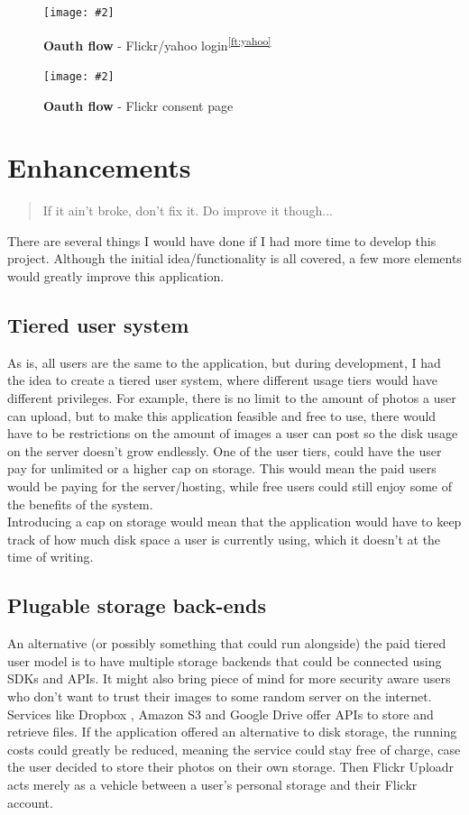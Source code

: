 \documentclass[10pt, a4paper]{article}
\newcommand{\figuremacro}[5]{
\begin{figure}[#1]
\centering
\texttt{[image: \#2]}
\caption[#3]{\textbf{#3}#4}
\label{fig:#2}
\end{figure}
}
\newcommand{\footref}[1]{\textsuperscript{\ref{#1}}}
\begin{document}
        \figuremacro{h}{flickr-login}{Oauth flow}{ - Flickr/yahoo login\footref{ft:yahoo}}{1.0}

        \figuremacro{h}{flickr-consent}{Oauth flow}{ - Flickr consent page}{1.0}

        \section{Enhancements}
        \label{sec:enhancements}
        \blockquote{If it ain't broke, don't fix it. Do improve it though...}

        There are several things I would have done if I had more time to develop this project. Although the initial idea/functionality is all covered, a few more elements would greatly improve this application. 

        \subsection{Tiered user system}	
        As is, all users are the same to the application, but during development, I had the idea to create a tiered user system, where different usage tiers would have different privileges. For example, there is no limit to the amount of photos a user can upload, but to make this application feasible and free to use, there would have to be restrictions on the amount of images a user can post so the disk usage on the server doesn't grow endlessly. One of the user tiers, could have the user pay for unlimited or a higher cap on storage. This would mean the paid users would be paying for the server/hosting, while free users could still enjoy some of the benefits of the system.\\
        Introducing a cap on storage would mean that the application would have to keep track of how much disk space a user is currently using, which it doesn't at the time of writing.

        \subsection{Plugable storage back-ends}
        An alternative (or possibly something that could run alongside) the paid tiered user model is to have multiple storage backends that could be connected using SDKs and APIs. It might also bring piece of mind for more security aware users who don't want to trust their images to some random server on the internet.
        Services like Dropbox \cite{dropbox}, Amazon S3 \cite{s3} and Google Drive \cite{gdrive} offer APIs to store and retrieve files. If the application offered an alternative to disk storage, the running costs could greatly be reduced, meaning the service could stay free of charge, case the user decided to store their photos on their own storage. Then Flickr Uploadr acts merely as a vehicle between a user's personal storage and their Flickr account. 
\end{document}
